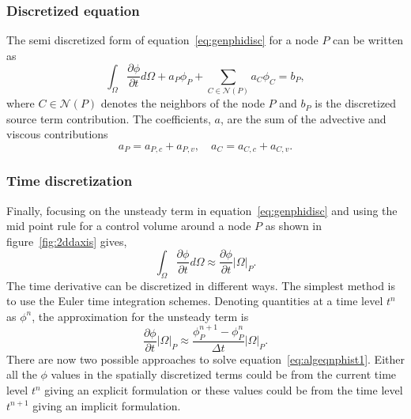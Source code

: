 \subsubsection{Discretized equation}
The semi discretized form of equation~\ref{eq:genphidisc} for a node $P$ can be written as
\begin{equation}
\int_{\Omega} \frac{\partial \phi}{\partial t} d\Omega + a_P \phi_P + \sum_{C\in\mathcal{N}(P)}a_{C}\phi_{C} = b_P,
\label{eq:algeqnphist1}
\end{equation}
where $C\in\mathcal{N}(P)$ denotes the neighbors of the node $P$ and $b_P$ is the discretized source term contribution. The coefficients, $a$, are the sum of the advective and viscous contributions
\begin{equation*}
a_P = a_{P,c} + a_{P,v}, \quad a_{C} = a_{C,c} + a_{C,v}.
\end{equation*}

\subsubsection{Time discretization}
Finally, focusing on the unsteady term in equation~\ref{eq:genphidisc} and using the mid point rule for a control volume around a node $P$ as shown in figure~\ref{fig:2ddaxis} gives,
\begin{equation}
\int_{\Omega} \frac{\partial \phi}{\partial t} d\Omega \approx \frac{\partial \phi}{\partial t} |\Omega|_P.
\end{equation}
The time derivative can be discretized in different ways. The simplest method is to use the Euler time integration schemes. Denoting quantities at a time level $t^n$ as $\phi^n$, the approximation for the unsteady term is
\begin{equation}
\frac{\partial \phi}{\partial t} |\Omega|_P \approx \frac{\phi^{n+1}_P - \phi^n_P}{\Delta t} |\Omega|_P.
\end{equation}
There are now two possible approaches to solve equation~\ref{eq:algeqnphist1}. Either all the $\phi$ values in the spatially discretized terms could be from the current time level $t^n$ giving an explicit formulation or these values could be from the time level $t^{n+1}$ giving an implicit formulation.
